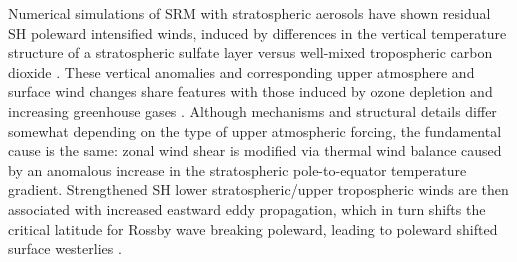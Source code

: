 \documentclass[grl]{AGUTeX}  %
\begin{document}
\begin{article}
%
%


Numerical simulations of SRM with stratospheric aerosols have shown residual SH poleward intensified winds, induced by differences in the vertical temperature structure of a stratospheric sulfate layer versus well-mixed tropospheric carbon dioxide \citep{ammann10,mccusker12}. These vertical anomalies and corresponding upper atmosphere and surface wind changes share features with those induced by ozone depletion \citep{gillett03,gillett13,sigmond11,thompson11} and increasing greenhouse gases \citep{gillett13,sigmond11,polvani11}. Although mechanisms and structural details differ somewhat depending on the type of upper atmospheric forcing, the fundamental cause is the same: zonal wind shear is modified via thermal wind balance caused by an anomalous increase in the stratospheric pole-to-equator temperature gradient. Strengthened SH lower stratospheric/upper tropospheric winds are then associated with increased eastward eddy propagation, which in turn shifts the critical latitude for Rossby wave breaking poleward, leading to poleward shifted surface westerlies \citep{chen07}.%


\end{article}
\end{document}
